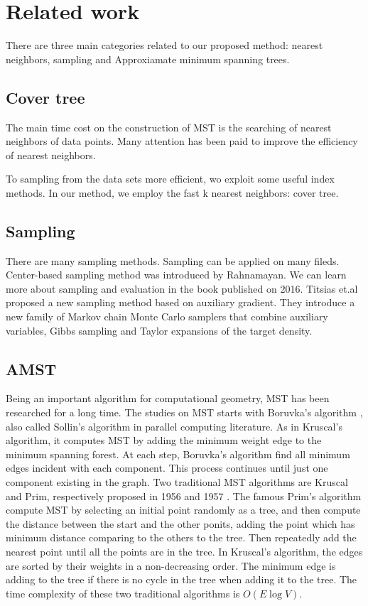 \section{Related work}
	There are three main categories related to our proposed method: nearest neighbors, sampling and Approxiamate minimum spanning trees. 
	\subsection{Cover tree}
		The main time cost on the construction of MST is the searching of nearest neighbors of data points. Many attention has been paid to improve the efficiency of nearest neighbors. 
		
 		To sampling from the data sets more efficient, wo exploit some useful index methods. 
		In our method, we employ the fast k nearest neighbors: cover tree. 
	\subsection{Sampling}
		There are many sampling methods. Sampling can be applied on many fileds. 
		Center-based sampling method was introduced by Rahnamayan\cite{Rahnamayan2009}. 
		We can learn more about sampling and evaluation in the book published on 2016\cite{Lance2016}. 
		Titsias et.al proposed a new sampling method based on auxiliary gradient\cite{Titsias2018}. They introduce a new family of Markov chain Monte Carlo samplers that combine auxiliary variables, Gibbs sampling and Taylor expansions of the target density. 
	\subsection{AMST}

		Being an important algorithm for computational geometry, MST has been researched for a long time. The studies on MST starts with Boruvka's algorithm \cite{zbMATH02560699}, also called Sollin's algorithm in  parallel computing literature. As in Kruscal's algorithm, it computes MST by adding the minimum weight edge to the minimum spanning forest. At each step, Boruvka's algorithm find all minimum edges incident with each component. This process continues until just one component existing in the graph. Two traditional MST algorithms are Kruscal and Prim, respectively proposed in 1956\cite{Kruskal1956On} and 1957 \cite{Prim2013Shortest}. The famous Prim's algorithm compute MST by selecting an initial point randomly as a tree, and then compute the distance between the start and the other ponits, adding the point which has minimum distance comparing to the others to the tree. Then repeatedly add the nearest point until all the points are in the tree. In Kruscal's algorithm, the edges are sorted by their weights in a non-decreasing order. The minimum edge is adding to the tree if there is no cycle in the tree when adding it to the tree. The time complexity of these two traditional algorithms is $O(E\log V)$. 

